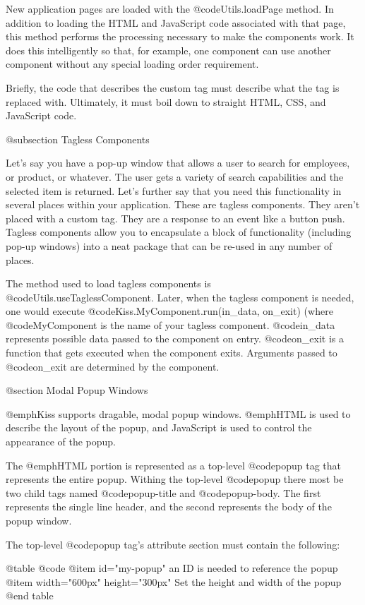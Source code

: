 New application pages are loaded with the @code{Utils.loadPage}
method.  In addition to loading the HTML and JavaScript code
associated with that page, this method performs the processing
necessary to make the components work.  It does this intelligently so
that, for example, one component can use another component without any
special loading order requirement.

Briefly, the code that describes the custom tag must describe what the
tag is replaced with.  Ultimately, it must boil down to straight HTML,
CSS, and JavaScript code.


@subsection Tagless Components

Let's say you have a pop-up window that allows a user to search for employees, or product, or whatever.
The user gets a variety of search capabilities and the selected item is returned. Let's further say
that you need this functionality in several places within your application.  These are tagless
components.  They aren't placed with a custom tag.  They are a response to an event like a button push.
Tagless components allow you to encapsulate a block of functionality (including pop-up windows) into
a neat package that can be re-used in any number of places.

The method used to load tagless components is
@code{Utils.useTaglessComponent}.  Later, when the tagless component
is needed, one would execute @code{Kiss.MyComponent.run(in_data, on_exit)} (where
@code{MyComponent} is the name of your tagless component.  
@code{in_data} represents possible data passed to the component on entry.
@code{on_exit} is a function that gets executed when the component exits.
Arguments passed to @code{on_exit} are determined by the component.


@section Modal Popup Windows

@emph{Kiss} supports dragable, modal popup windows. @emph{HTML} is
used to describe the layout of the popup, and JavaScript is used to
control the appearance of the popup.

The @emph{HTML} portion is represented as a top-level @code{popup} tag
that represents the entire popup.  Withing the top-level @code{popup}
there most be two child tags named @code{popup-title} and
@code{popup-body}.  The first represents the single line header, and
the second represents the body of the popup window.

The top-level @code{popup} tag's attribute section must contain the following:

@table @code
@item id="my-popup"
an ID is needed to reference the popup
@item width="600px" height="300px"
Set the height and width of the popup
@end table

